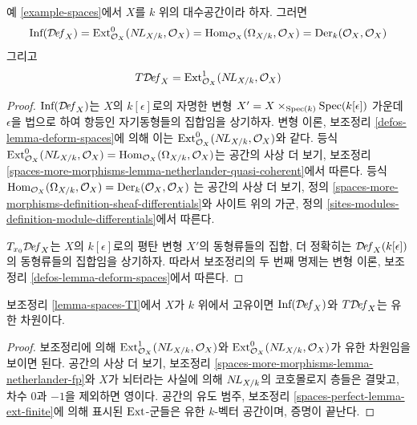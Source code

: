 \begin{lemma}
\label{lemma-spaces-TI}
예 \ref{example-spaces}에서 $X$를 $k$ 위의 대수공간이라 하자. 그러면
$$
\text{Inf}(\mathcal{D}\!\mathit{ef}_X) =
\text{Ext}^0_{\mathcal{O}_X}(\mathop{N\!L}\nolimits_{X/k}, \mathcal{O}_X) =
\mathop{\mathrm{Hom}}\nolimits_{\mathcal{O}_X}(\Omega_{X/k}, \mathcal{O}_X) =
\text{Der}_k(\mathcal{O}_X, \mathcal{O}_X)
$$
그리고
$$
T\mathcal{D}\!\mathit{ef}_X =
\text{Ext}^1_{\mathcal{O}_X}(\mathop{N\!L}\nolimits_{X/k}, \mathcal{O}_X)
$$
\end{lemma}

\begin{proof}
$\text{Inf}(\mathcal{D}\!\mathit{ef}_X)$는 $X$의 $k[\epsilon]$로의 자명한 변형
$X' = X \times_{\mathop{\mathrm{Spec}}(k)} \mathop{\mathrm{Spec}}(k[\epsilon])$ 가운데 $\epsilon$을 법으로 하여
항등인 자기동형들의 집합임을 상기하자. 변형 이론, 보조정리
\ref{defos-lemma-deform-spaces}에 의해 이는
$\text{Ext}^0_{\mathcal{O}_X}(\mathop{N\!L}\nolimits_{X/k}, \mathcal{O}_X)$와 같다. 등식
$\text{Ext}^0_{\mathcal{O}_X}(\mathop{N\!L}\nolimits_{X/k}, \mathcal{O}_X) =
\mathop{\mathrm{Hom}}\nolimits_{\mathcal{O}_X}(\Omega_{X/k}, \mathcal{O}_X)$는 공간의 사상 더 보기,
보조정리 \ref{spaces-more-morphisms-lemma-netherlander-quasi-coherent}에서
따른다. 등식
$\mathop{\mathrm{Hom}}\nolimits_{\mathcal{O}_X}(\Omega_{X/k}, \mathcal{O}_X) =
\text{Der}_k(\mathcal{O}_X, \mathcal{O}_X)$
는 공간의 사상 더 보기, 정의
\ref{spaces-more-morphisms-definition-sheaf-differentials}와 사이트 위의 가군,
정의 \ref{sites-modules-definition-module-differentials}에서 따른다.

\medskip\noindent
$T_{x_0}\mathcal{D}\!\mathit{ef}_X$는 $X$의 $k[\epsilon]$로의 평탄 변형 $X'$의
동형류들의 집합, 더 정확히는 $\mathcal{D}\!\mathit{ef}_X(k[\epsilon])$의
동형류들의 집합임을 상기하자. 따라서 보조정리의 두 번째 명제는
변형 이론, 보조정리 \ref{defos-lemma-deform-spaces}에서 따른다.
\end{proof}

\begin{lemma}
\label{lemma-proper-spaces-TI}
보조정리 \ref{lemma-spaces-TI}에서 $X$가 $k$ 위에서 고유이면
$\text{Inf}(\mathcal{D}\!\mathit{ef}_X)$와 $T\mathcal{D}\!\mathit{ef}_X$는
유한 차원이다.
\end{lemma}

\begin{proof}
보조정리에 의해 $\mathop{\mathrm{Ext}}\nolimits^1_{\mathcal{O}_X}(\mathop{N\!L}\nolimits_{X/k}, \mathcal{O}_X)$와
$\mathop{\mathrm{Ext}}\nolimits^0_{\mathcal{O}_X}(\mathop{N\!L}\nolimits_{X/k}, \mathcal{O}_X)$가 유한 차원임을
보이면 된다. 공간의 사상 더 보기, 보조정리
\ref{spaces-more-morphisms-lemma-netherlander-fp}와 $X$가 뇌터라는 사실에
의해 $\mathop{N\!L}\nolimits_{X/k}$의 코호몰로지 층들은 결맞고, 차수 $0$과 $-1$을
제외하면 영이다. 공간의 유도 범주, 보조정리
\ref{spaces-perfect-lemma-ext-finite}에 의해 표시된 $\mathop{\mathrm{Ext}}\nolimits$-군들은 유한
$k$-벡터 공간이며, 증명이 끝난다.
\end{proof}

